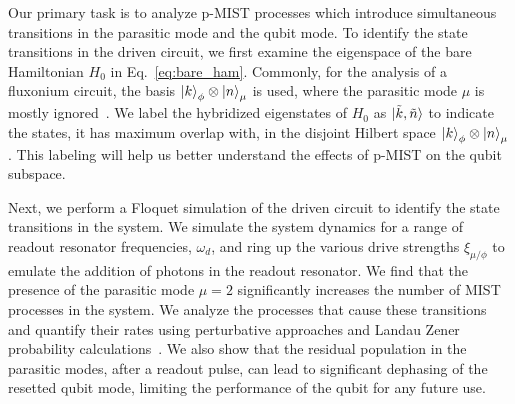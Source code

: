 \documentclass[%
reprint,
superscriptaddress,
 amsmath,amssymb,
 aps,
 prx,
longbibliography,
floatfix,
]{revtex4-2}
\begin{document}
Our primary task is to analyze p-MIST processes which introduce simultaneous transitions in the parasitic mode and the qubit mode. To identify the state transitions in the driven circuit, we first examine the eigenspace of the bare Hamiltonian $H_0$ in Eq.~\ref{eq:bare_ham}. Commonly, for the analysis of a fluxonium circuit, the basis $\ket{k}_{\phi} \otimes \ket{n}_{\mu}$ is used, where the parasitic mode $\mu$ is mostly ignored~\cite{nesterov2024measurement}. We label the hybridized eigenstates of $H_{\textrm{0}}$ as  $\ket{\tilde{k}, \tilde{n}}$ to indicate the states, it has maximum overlap with, in the disjoint Hilbert space $\ket{k}_\phi\otimes\ket{n}_\mu$. This labeling will help us better understand the effects of p-MIST on the qubit subspace.


Next, we perform a Floquet simulation of the driven circuit to identify the state transitions in the system. We simulate the system dynamics for a range of readout resonator frequencies, $\omega_d$, and ring up the various drive strengths $\xi_{\mu/\phi}$ to emulate the addition of photons in the readout resonator. We find that the presence of the parasitic mode $\mu=2$ significantly increases the number of MIST processes in the system. We analyze the processes that cause these transitions and quantify their rates using perturbative approaches and Landau Zener probability calculations~\cite{ikeda2022floquet}. We also show that the residual population in the parasitic modes, after a readout pulse, can lead to significant dephasing of the resetted qubit mode, limiting the performance of the qubit for any future use.
\end{document}
